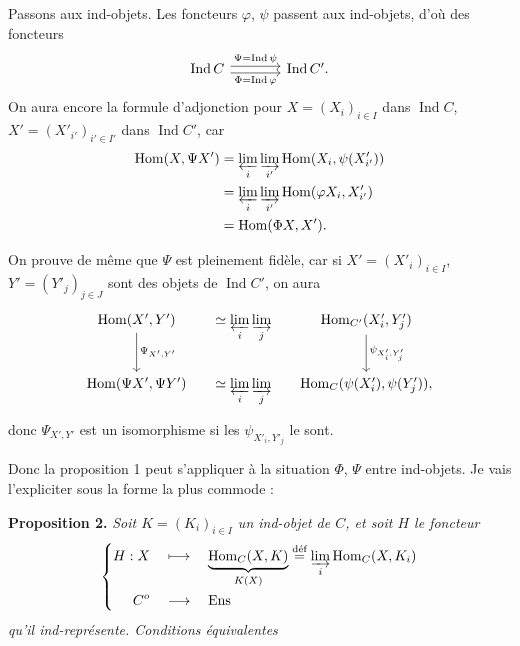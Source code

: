 \documentclass[11pt]{article}
\newcommand{\msp}[1]{\marginpar{\footnotesize [#1]}}
\newcommand{\Hom}{\mathrm{Hom}}
\newcommand{\Ind}{\operatorname{Ind}}
\newcommand{\Ens}{\mathrm{Ens}}
\begin{document}
Passons aux ind-objets. Les foncteurs $\varphi$, $\psi$ passent aux ind-objets, d'où des foncteurs
\[
\begin{tikzcd}[column sep=large]
\Ind C \arrow[r,shift left,"\Psi = \Ind\psi"] \arrow[r,shift right,"\Phi = \Ind\varphi"'] & \Ind C'.
\end{tikzcd} %
\]
On aura encore la formule d'adjonction pour $X = (X_i)_{i\in I}$ dans $\Ind C$, $X' = (X'_{i'})_{i'\in I'}$ dans $\Ind C'$, car
\[
\begin{aligned}
\Hom(X,\Psi X') &= \varprojlim_i \varinjlim_{i'} \Hom(X_i,\psi(X'_{i'}))\\
&= \varprojlim_i \varinjlim_{i'} \Hom(\varphi X_i,X'_{i'})\\
&= \Hom(\Phi X,X').
\end{aligned}
\]

\noindent\msp{page 41}%
On prouve de même que $\Psi$ est pleinement fidèle, car si $X' = (X'_i)_{i\in I}$, $Y' = (Y'_j)_{j\in J}$ sont des objets de $\Ind C'$, on aura
\[
\begin{tikzcd}[column sep=small]
\Hom(X',Y') \arrow[d,"\Psi_{X',Y'}"] & \simeq \varprojlim\limits_i \varinjlim\limits_j & \Hom_{C'}(X'_i,Y'_j) \arrow[d,"\psi_{X'_i,Y'_j}"] \\
\Hom(\Psi X',\Psi Y') & \simeq \varprojlim\limits_i \varinjlim\limits_j & \Hom_C(\psi(X'_i),\psi(Y'_j)),
\end{tikzcd}
\]
donc $\Psi_{X',Y'}$ est un isomorphisme si les $\psi_{X'_i,Y'_j}$ le sont.

Donc la proposition 1 peut s'appliquer à la situation $\Phi$, $\Psi$ entre ind-objets. Je vais l'expliciter sous la forme la plus commode :

\textbf{Proposition 2.} \textit{Soit $K = (K_i)_{i\in I}$ un ind-objet de $C$, et soit $H$ le foncteur}
\[
\left\{
\begin{aligned}
H : X \quad &\longmapsto \quad \underbrace{\Hom_C(X,K)}_{K(X)} \overset{\text{déf}}{=} \varinjlim_i \Hom_C(X,K_i)\\
C^o \quad &\longrightarrow \quad \Ens
\end{aligned}
\right.
\]
\textit{qu'il ind-représente. Conditions équivalentes}
\end{document}
